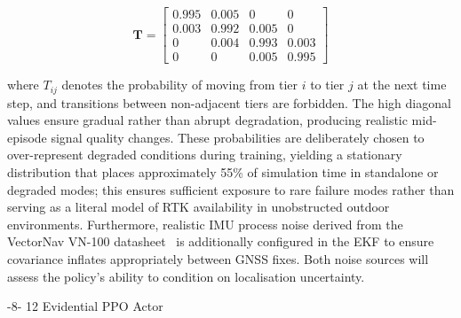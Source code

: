 \documentclass{sig-alternate}
\makeatletter
\renewcommand\subsection{\@startsection{subsection}{2}{\z@}%
    {-8\p@ \@plus -2\p@ \@minus -\p@}%
    {12\p@}%
    {\secfnt}}
\makeatother
\begin{document}
\begin{equation}
    \mathbf{T} = \begin{bmatrix}
        0.995 & 0.005 & 0     & 0     \\
        0.003 & 0.992 & 0.005 & 0     \\
        0     & 0.004 & 0.993 & 0.003 \\
        0     & 0     & 0.005 & 0.995
    \end{bmatrix}
    \label{eq:markov}
\end{equation}

\noindent where $T_{ij}$ denotes the probability of moving from tier $i$ to tier $j$ at the next time step, and transitions between non-adjacent tiers are forbidden. The high diagonal values ensure gradual rather than abrupt degradation, producing realistic mid-episode signal quality changes. These probabilities are deliberately chosen to over-represent degraded conditions during training, yielding a stationary distribution that places approximately 55\% of simulation time in standalone or degraded modes; this ensures sufficient exposure to rare failure modes rather than serving as a literal model of RTK availability in unobstructed outdoor environments. Furthermore, realistic IMU process noise derived from the VectorNav VN-100 datasheet~\cite{vectornav2023vn100} is additionally configured in the EKF to ensure covariance inflates appropriately between GNSS fixes. Both noise sources will assess the policy's ability to condition on localisation uncertainty.

\subsection{Evidential PPO Actor}


\end{document}
